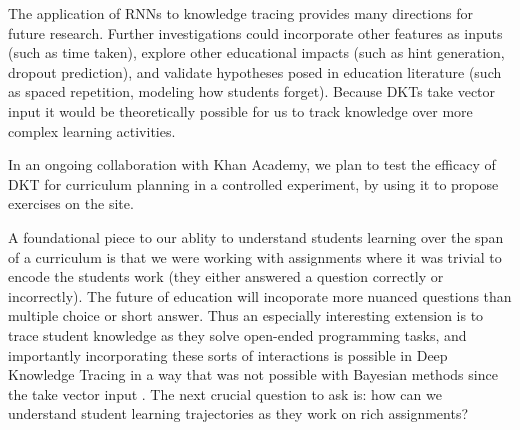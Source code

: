 The application of RNNs to knowledge tracing provides many directions for future research. Further investigations could incorporate other features as inputs (such as time taken), explore other educational impacts (such as hint generation, dropout prediction), and validate hypotheses posed in education literature (such as spaced repetition, modeling how students forget).
Because DKTs take vector input it would be theoretically possible for us to track knowledge over more complex learning activities.

In an ongoing collaboration with Khan Academy, we plan to test the efficacy of DKT for curriculum planning in a controlled experiment, by using it to propose exercises on the site. 

A foundational piece to our ablity to understand students learning over the span of a curriculum is that we were working with assignments where it was trivial to encode the students work (they either answered a question correctly or incorrectly). The future of education will incoporate more nuanced questions than multiple choice or short answer. Thus an especially interesting extension is to trace student knowledge as they solve open-ended programming tasks, and importantly incorporating these sorts of interactions is possible in Deep Knowledge Tracing in a way that was not possible with Bayesian methods since the take vector input
. The next crucial question to ask is: how can we understand student learning trajectories as they work on rich assignments?
